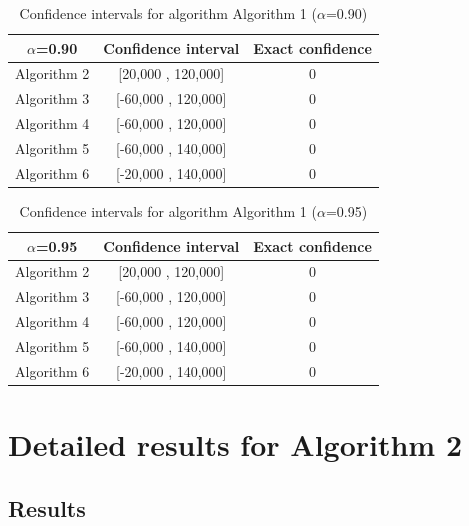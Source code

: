 \documentclass[a4paper,10pt]{article}
\begin{document}
\begin{table}[!htp]
\centering\small
\begin{tabular}{
|c|c|c|}
\hline
 $\alpha$=0.90 & Confidence interval & Exact confidence \\ \hline 
Algorithm 2 & [20,000 , 120,000] & 0\\ \hline 
Algorithm 3 & [-60,000 , 120,000] & 0\\ \hline 
Algorithm 4 & [-60,000 , 120,000] & 0\\ \hline 
Algorithm 5 & [-60,000 , 140,000] & 0\\ \hline 
Algorithm 6 & [-20,000 , 140,000] & 0\\ \hline 

\end{tabular}
\caption{Confidence intervals for algorithm Algorithm 1 ($\alpha$=0.90)}
\end{table}
\begin{table}[!htp]
\centering\small
\begin{tabular}{
|c|c|c|}
\hline
 $\alpha$=0.95 & Confidence interval & Exact confidence \\ \hline 
Algorithm 2 & [20,000 , 120,000] & 0\\ \hline 
Algorithm 3 & [-60,000 , 120,000] & 0\\ \hline 
Algorithm 4 & [-60,000 , 120,000] & 0\\ \hline 
Algorithm 5 & [-60,000 , 140,000] & 0\\ \hline 
Algorithm 6 & [-20,000 , 140,000] & 0\\ \hline 

\end{tabular}
\caption{Confidence intervals for algorithm Algorithm 1 ($\alpha$=0.95)}
\end{table}

 \clearpage 


\section{Detailed results for Algorithm 2}


\subsection{Results}
\end{document}
